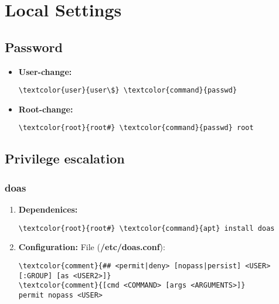 \documentclass[10pt, a4paper, onecolumn, openany]{book} %
\begin{document}
\chapter{Local Settings}
\section{Password}
\begin{itemize}
    \item \textbf{User-change:}
\begin{Verbatim}[commandchars=\\\{\}]
\textcolor{user}{user\$} \textcolor{command}{passwd}
\end{Verbatim}
    \item \textbf{Root-change:}
\begin{Verbatim}[commandchars=\\\{\}]
\textcolor{root}{root#} \textcolor{command}{passwd} root
\end{Verbatim}
\end{itemize}
\section{Privilege escalation}
\subsection{doas}
\begin{enumerate}
    \item \textbf{Dependenices:}
\begin{Verbatim}[commandchars=\\\{\}]
\textcolor{root}{root#} \textcolor{command}{apt} install doas
\end{Verbatim}
    \item \textbf{Configuration:}
\newline File (\textbf{\textcolor{file}{/etc/doas.conf}}):
\begin{Verbatim}[commandchars=\\\{\}]
\textcolor{comment}{## <permit|deny> [nopass|persist] <USER>[:GROUP] [as <USER2>]}
\textcolor{comment}{[cmd <COMMAND> [args <ARGUMENTS>]}
permit nopass <USER>
\end{Verbatim}    
\end{enumerate}
\end{document}
